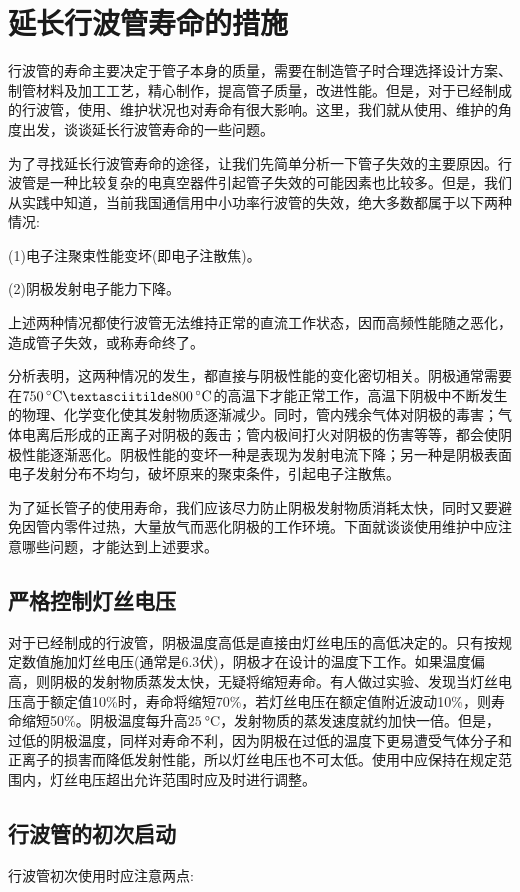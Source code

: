 \section{延长行波管寿命的措施} \label{ch12-sec4}

行波管的寿命主要决定于管子本身的质量，需要在制造管子时合理选择设计方案、制管材料及加工工艺，精心制作，提高管子质量，改进性能。但是，对于已经制成的行波管，使用、维护状况也对寿命有很大影响。这里，我们就从使用、维护的角度出发，谈谈延长行波管寿命的一些问题。

为了寻找延长行波管寿命的途径，让我们先简单分析一下管子失效的主要原因。行波管是一种比较复杂的电真空器件引起管子失效的可能因素也比较多。但是，我们从实践中知道，当前我国通信用中小功率行波管的失效，绝大多数都属于以下两种情况:

(1)电子注聚束性能变坏(即电子注散焦)。

(2)阴极发射电子能力下降。

上述两种情况都使行波管无法维持正常的直流工作状态，因而高频性能随之恶化，造成管子失效，或称寿命终了。

分析表明，这两种情况的发生，都直接与阴极性能的变化密切相关。阴极通常需要在$ \SI{750}{\degreeCelsius} \textasciitilde \SI{800}{\degreeCelsius} $的高温下才能正常工作，高温下阴极中不断发生的物理、化学变化使其发射物质逐渐减少。同时，管内残余气体对阴极的毒害；气体电离后形成的正离子对阴极的轰击；管内极间打火对阴极的伤害等等，都会使阴极性能逐渐恶化。阴极性能的变坏一种是表现为发射电流下降；另一种是阴极表面电子发射分布不均匀，破坏原来的聚束条件，引起电子注散焦。

为了延长管子的使用寿命，我们应该尽力防止阴极发射物质消耗太快，同时又要避免因管内零件过热，大量放气而恶化阴极的工作环境。下面就谈谈使用维护中应注意哪些问题，才能达到上述要求。

\subsection{严格控制灯丝电压}
对于已经制成的行波管，阴极温度高低是直接由灯丝电压的高低决定的。只有按规定数值施加灯丝电压(通常是6.3伏)，阴极才在设计的温度下工作。如果温度偏高，则阴极的发射物质蒸发太快，无疑将缩短寿命。有人做过实验、发现当灯丝电压高于额定值10\%时，寿命将缩短70\%，若灯丝电压在额定值附近波动10\%，则寿命缩短50\%。阴极温度每升高$ \SI{25}{\degreeCelsius} $，发射物质的蒸发速度就约加快一倍。但是，过低的阴极温度，同样对寿命不利，因为阴极在过低的温度下更易遭受气体分子和正离子的损害而降低发射性能，所以灯丝电压也不可太低。使用中应保持在规定范围内，灯丝电压超出允许范围时应及时进行调整。
\subsection{行波管的初次启动}
行波管初次使用时应注意两点:

